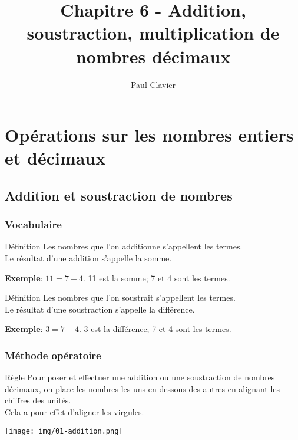 \documentclass[12pt,a4paper]{article}
\author{Paul Clavier}
\title{Chapitre 6 - Addition, soustraction, multiplication de nombres décimaux}
\begin{document}
\renewcommand\thesection{\Roman{section}}
\renewcommand\thesubsection{\arabic{subsection}}


\ifdefined\isprof
	\TeacherModeOn
\fi




\begin{center}
\end{center}

\section{Opérations sur les nombres entiers et décimaux}
\subsection{Addition et soustraction de nombres}
\subsubsection{Vocabulaire}
\begin{definition}{Définition}
Les nombres que l'on additionne s'appellent les termes.\\
Le résultat d'une addition s'appelle la somme.
\end{definition}
\textbf{Exemple}: $11 = 7 + 4$. 11 est la somme; 7 et 4 sont les termes.
\begin{definition}{Définition}
Les nombres que l'on soustrait s'appellent les termes.\\
Le résultat d'une soustraction s'appelle la différence.
\end{definition}
\textbf{Exemple}: $3 = 7 - 4$. 3 est la différence; 7 et 4 sont les termes.

\subsubsection{Méthode opératoire}
\begin{definition}{Règle}
Pour poser et effectuer une addition ou une soustraction de nombres décimaux, on place les nombres les uns en dessous des autres en alignant les chiffres des unités.\\
Cela a pour effet d'aligner les virgules.
\end{definition}
\texttt{[image: img/01-addition.png]}
\end{document}
